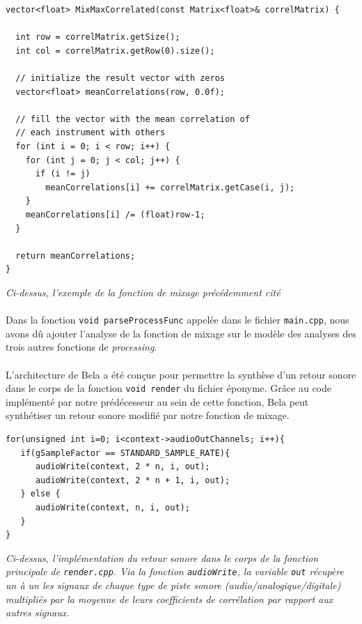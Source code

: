 \begin{lstlisting}
vector<float> MixMaxCorrelated(const Matrix<float>& correlMatrix) {

  int row = correlMatrix.getSize();
  int col = correlMatrix.getRow(0).size();

  // initialize the result vector with zeros
  vector<float> meanCorrelations(row, 0.0f);

  // fill the vector with the mean correlation of
  // each instrument with others
  for (int i = 0; i < row; i++) {
    for (int j = 0; j < col; j++) {
      if (i != j)
        meanCorrelations[i] += correlMatrix.getCase(i, j);
    }
    meanCorrelations[i] /= (float)row-1;
  }

  return meanCorrelations;
}
\end{lstlisting}

\begin{center}
 \textit{Ci-dessus, l'exemple de la fonction de mixage précédemment cité}
\end{center}

\paragraph{}
Dans la fonction \verb!void parseProcessFunc!  appelée dans le fichier
\verb!main.cpp!, nous avons dû ajouter l'analyse de la fonction de
mixage sur le modèle des analyses des trois autres fonctions de
\textit{processing}.

\paragraph{}
L'architecture de Bela a été conçue pour permettre la synthèse d'un
retour sonore dans le corps de la fonction \verb!void render! du
fichier éponyme. Grâce au code implémenté par notre prédécesseur au
sein de cette fonction, Bela peut synthétiser un retour sonore modifié
par notre fonction de mixage.

\begin{lstlisting}
for(unsigned int i=0; i<context->audioOutChannels; i++){
   if(gSampleFactor == STANDARD_SAMPLE_RATE){
      audioWrite(context, 2 * n, i, out);
      audioWrite(context, 2 * n + 1, i, out);
   } else {
      audioWrite(context, n, i, out);
   }
}
\end{lstlisting}

\begin{center} \textit{Ci-dessus, l'implémentation du retour sonore
  dans le corps de la fonction principale de \verb!render.cpp!. Via la
  fonction \verb!audioWrite!, la variable \verb!out! récupère un à un
  les signaux de chaque type de piste sonore
  (audio/analogique/digitale) multipliés par la moyenne de leurs
  coefficients de corrélation par rapport aux autres
  signaux.} \end{center}
 
